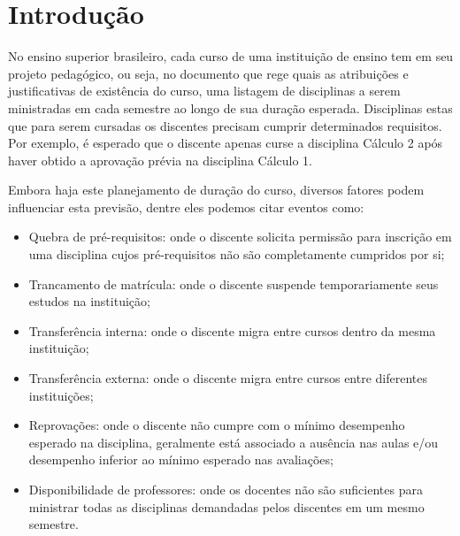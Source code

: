 \chapter{Introdução} %




No ensino superior brasileiro, cada curso de uma instituição de ensino tem em seu projeto pedagógico, ou seja, no documento que rege quais as atribuições e justificativas de existência do curso, uma listagem de disciplinas a serem ministradas em cada semestre ao longo de sua duração esperada. Disciplinas estas que para serem cursadas os discentes precisam cumprir determinados requisitos. Por exemplo, é esperado que o discente apenas curse a disciplina Cálculo 2 após haver obtido a aprovação prévia na disciplina Cálculo 1.


Embora haja este planejamento de duração do curso, diversos fatores podem influenciar esta previsão, dentre eles podemos citar eventos como:

\begin{itemize}
    \item Quebra de pré-requisitos: onde o discente solicita permissão para inscrição em uma disciplina cujos pré-requisitos não são completamente cumpridos por si;
    \item Trancamento de matrícula: onde o discente suspende temporariamente seus estudos na instituição;
    \item Transferência interna: onde o discente migra entre cursos dentro da mesma instituição;
    \item Transferência externa: onde o discente migra entre cursos entre diferentes instituições;
    \item Reprovações: onde o discente não cumpre com o mínimo desempenho esperado na disciplina, geralmente está associado a ausência nas aulas e/ou desempenho inferior ao mínimo esperado nas avaliações;
    \item Disponibilidade de professores: onde os docentes não são suficientes para ministrar todas as disciplinas demandadas pelos discentes em um mesmo semestre.
\end{itemize}

